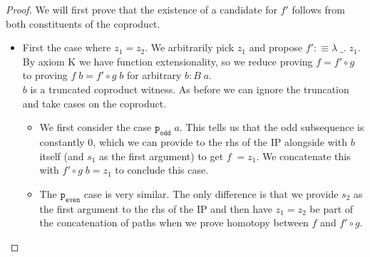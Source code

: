 \documentclass[12pt]{article}
\begin{document}
\begin{proof}
We will first prove that the existence of a candidate for $f'$ follows from both constituents of the coproduct.
\begin{itemize}
\item First the case where $z_1= z_2$. 
We arbitrarily pick $z_1$ and propose $f' : \equiv \lambda \;\_.\; z_1$. 
By axiom K we have function extensionality, so we reduce proving $f= f' \circ g$ to proving $f\; b = f'\circ g\; b$ for arbitrary $b : B\; a$. \\
$b$ is a truncated coproduct witness. 
As before we can ignore the truncation and take cases on the coproduct. 
\begin{itemize}
\item We first consider the case $\mathtt{p_{odd}}\; a$. 
This tells us that the odd subsequence is constantly $0$, which we can provide to the rhs of the IP alongside with $b$  itself (and $s_1$ as the first argument) to get $f\; = z_1$. We concatenate this with $f' \circ g \; b = z_1$ to conclude this case. 
\item The $\mathtt{p_{even}}$ case is very similar. 
The only difference is that we provide $s_2$ as the first argument to the rhs of the IP and then have $z_1=z_2$ be part of the concatenation of paths when we prove homotopy between $f$ and $f' \circ g$. 
\end{itemize}


\end{itemize}
\end{proof}
\end{document}
